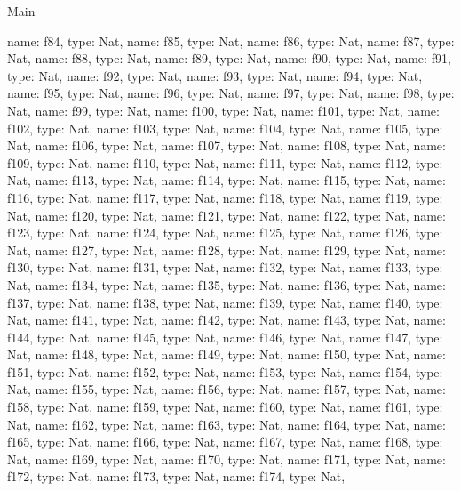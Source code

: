 \begin{lexlean}{Main}
\begin{semanticmodule}
{    {name: f84, type: Nat},
    {name: f85, type: Nat},
    {name: f86, type: Nat},
    {name: f87, type: Nat},
    {name: f88, type: Nat},
    {name: f89, type: Nat},
    {name: f90, type: Nat},
    {name: f91, type: Nat},
    {name: f92, type: Nat},
    {name: f93, type: Nat},
    {name: f94, type: Nat},
    {name: f95, type: Nat},
    {name: f96, type: Nat},
    {name: f97, type: Nat},
    {name: f98, type: Nat},
    {name: f99, type: Nat},
    {name: f100, type: Nat},
    {name: f101, type: Nat},
    {name: f102, type: Nat},
    {name: f103, type: Nat},
    {name: f104, type: Nat},
    {name: f105, type: Nat},
    {name: f106, type: Nat},
    {name: f107, type: Nat},
    {name: f108, type: Nat},
    {name: f109, type: Nat},
    {name: f110, type: Nat},
    {name: f111, type: Nat},
    {name: f112, type: Nat},
    {name: f113, type: Nat},
    {name: f114, type: Nat},
    {name: f115, type: Nat},
    {name: f116, type: Nat},
    {name: f117, type: Nat},
    {name: f118, type: Nat},
    {name: f119, type: Nat},
    {name: f120, type: Nat},
    {name: f121, type: Nat},
    {name: f122, type: Nat},
    {name: f123, type: Nat},
    {name: f124, type: Nat},
    {name: f125, type: Nat},
    {name: f126, type: Nat},
    {name: f127, type: Nat},
    {name: f128, type: Nat},
    {name: f129, type: Nat},
    {name: f130, type: Nat},
    {name: f131, type: Nat},
    {name: f132, type: Nat},
    {name: f133, type: Nat},
    {name: f134, type: Nat},
    {name: f135, type: Nat},
    {name: f136, type: Nat},
    {name: f137, type: Nat},
    {name: f138, type: Nat},
    {name: f139, type: Nat},
    {name: f140, type: Nat},
    {name: f141, type: Nat},
    {name: f142, type: Nat},
    {name: f143, type: Nat},
    {name: f144, type: Nat},
    {name: f145, type: Nat},
    {name: f146, type: Nat},
    {name: f147, type: Nat},
    {name: f148, type: Nat},
    {name: f149, type: Nat},
    {name: f150, type: Nat},
    {name: f151, type: Nat},
    {name: f152, type: Nat},
    {name: f153, type: Nat},
    {name: f154, type: Nat},
    {name: f155, type: Nat},
    {name: f156, type: Nat},
    {name: f157, type: Nat},
    {name: f158, type: Nat},
    {name: f159, type: Nat},
    {name: f160, type: Nat},
    {name: f161, type: Nat},
    {name: f162, type: Nat},
    {name: f163, type: Nat},
    {name: f164, type: Nat},
    {name: f165, type: Nat},
    {name: f166, type: Nat},
    {name: f167, type: Nat},
    {name: f168, type: Nat},
    {name: f169, type: Nat},
    {name: f170, type: Nat},
    {name: f171, type: Nat},
    {name: f172, type: Nat},
    {name: f173, type: Nat},
    {name: f174, type: Nat},
}
\end{semanticmodule}
\end{lexlean}
